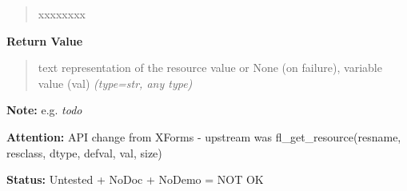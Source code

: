 \begin{boxedminipage}{\funcwidth}
\begin{quote}
\begin{Ventry}{xxxxxxxx}
        \end{Ventry}

      \end{quote}

      \textbf{Return Value}
    \vspace{-1ex}

      \begin{quote}

text representation of the resource value or None (on failure),
variable value (val)
      {\it (type=str, any type)}

      \end{quote}

\textbf{Note:} 
e.g. \emph{todo}


\textbf{Attention:} 
API change from XForms - upstream was
fl\_get\_resource(resname, resclass, dtype, defval, val, size)


\textbf{Status:} 
Untested + NoDoc + NoDemo = NOT OK


    \end{boxedminipage}

    \label{xformslib:flxbasic:fl_set_resource}

    \vspace{0.5ex}

